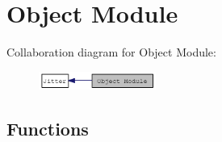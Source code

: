 \hypertarget{group__objectmod}{
\section{Object Module}
\label{group__objectmod}
}


Collaboration diagram for Object Module:\nopagebreak
\begin{figure}[H]
\begin{center}
\leavevmode
\includegraphics[width=109pt]{group__objectmod}
\end{center}
\end{figure}
\subsection*{Functions}
